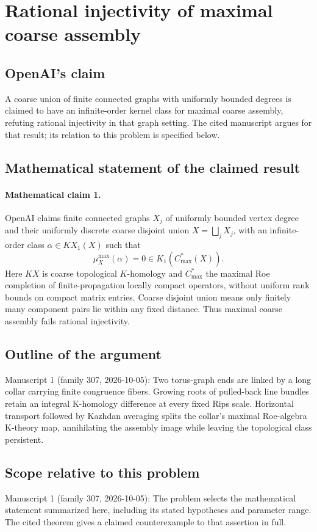 \documentclass[11pt]{article}
\begin{document}
\section*{Rational injectivity of maximal coarse assembly}

\subsection{OpenAI's claim}
A coarse union of finite connected graphs with uniformly bounded degrees is claimed to have an infinite-order kernel class for maximal coarse assembly, refuting rational injectivity in that graph setting. The cited manuscript argues for that result; its relation to this problem is specified below.

\subsection{Mathematical statement of the claimed result}
\paragraph{Mathematical claim 1.} OpenAI claims finite connected graphs $X_j$ of uniformly bounded vertex degree and their uniformly discrete coarse disjoint union $X=\bigsqcup_jX_j$, with an infinite-order class $\alpha\in KX_1(X)$ such that
\[
\mu_X^{\max}(\alpha)=0\in K_1(C^*_{\max}(X)).
\]
Here $KX$ is coarse topological $K$-homology and $C^*_{\max}$ the maximal Roe completion of finite-propagation locally compact operators, without uniform rank bounds on compact matrix entries. Coarse disjoint union means only finitely many component pairs lie within any fixed distance. Thus maximal coarse assembly fails rational injectivity.

\subsection{Outline of the argument}
Manuscript 1 (family 307, 2026-10-05): Two torus-graph ends are linked by a long collar carrying finite congruence fibers. Growing roots of pulled-back line bundles retain an integral K-homology difference at every fixed Rips scale. Horizontal transport followed by Kazhdan averaging splits the collar's maximal Roe-algebra K-theory map, annihilating the assembly image while leaving the topological class persistent.

\subsection{Scope relative to this problem}
Manuscript 1 (family 307, 2026-10-05): The problem selects the mathematical statement summarized here, including its stated hypotheses and parameter range. The cited theorem gives a claimed counterexample to that assertion in full.
\end{document}
